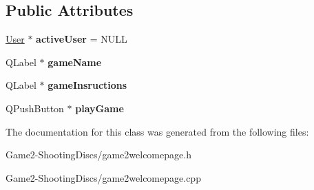\subsection*{Public Attributes}
\begin{DoxyCompactItemize}
\item 
\mbox{\label{classGame2WelcomePage_a1839c53ae10ec1b5dc2f158a74fff1ff}} 
\hyperlink{classUser}{User} $\ast$ {\bfseries active\+User} = N\+U\+LL
\item 
\mbox{\label{classGame2WelcomePage_a6cb475e10f6095d72ca0bce9948222c4}} 
Q\+Label $\ast$ {\bfseries game\+Name}
\item 
\mbox{\label{classGame2WelcomePage_a4477b9e97fc0f815c84b1e9e6475e3ce}} 
Q\+Label $\ast$ {\bfseries game\+Insructions}
\item 
\mbox{\label{classGame2WelcomePage_a8ae329cbb14582c73bcd03275b119fed}} 
Q\+Push\+Button $\ast$ {\bfseries play\+Game}
\end{DoxyCompactItemize}


The documentation for this class was generated from the following files\+:\begin{DoxyCompactItemize}
\item 
Game2-\/\+Shooting\+Discs/game2welcomepage.\+h\item 
Game2-\/\+Shooting\+Discs/game2welcomepage.\+cpp\end{DoxyCompactItemize}
